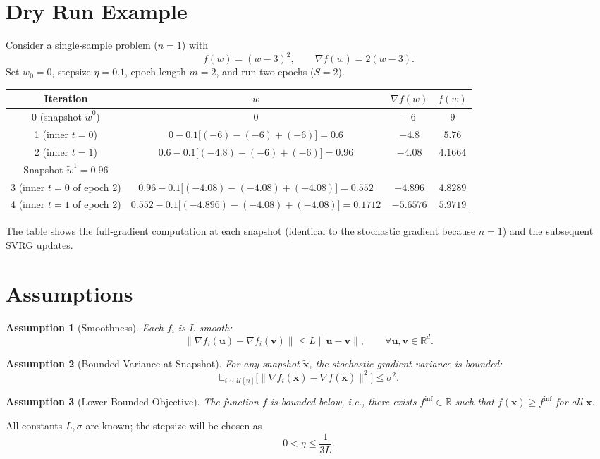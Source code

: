 \documentclass{article}
\newtheorem{assumption}{Assumption}
\newcommand{\EE}{\mathbb{E}}
\newcommand{\RR}{\mathbb{R}}
\begin{document}
\section*{Dry Run Example}
Consider a single‑sample problem ($n=1$) with
\[
f(w)= (w-3)^2,\qquad \nabla f(w)=2(w-3).
\]
Set $w_0=0$, stepsize $\eta=0.1$, epoch length $m=2$, and run two epochs ($S=2$).

\begin{center}
\begin{tabular}{c|c|c|c}
Iteration & $w$ & $\nabla f(w)$ & $f(w)$\\ \hline
0 (snapshot $\tilde w^0$) & $0$ & $-6$ & $9$\\
1 (inner $t=0$) & $0-0.1\bigl[(-6)-(-6)+(-6)\bigr]=0.6$ & $-4.8$ & $5.76$\\
2 (inner $t=1$) & $0.6-0.1\bigl[(-4.8)-(-6)+(-6)\bigr]=0.96$ & $-4.08$ & $4.1664$\\ \hline
Snapshot $\tilde w^1=0.96$ &  &  &  \\ \hline
3 (inner $t=0$ of epoch 2) & $0.96-0.1\bigl[(-4.08)-(-4.08)+(-4.08)\bigr]=0.552$ & $-4.896$ & $4.8289$\\
4 (inner $t=1$ of epoch 2) & $0.552-0.1\bigl[(-4.896)-(-4.08)+(-4.08)\bigr]=0.1712$ & $-5.6576$ & $5.9719$
\end{tabular}
\end{center}
The table shows the full‑gradient computation at each snapshot (identical to the stochastic gradient because $n=1$) and the subsequent SVRG updates.

\section*{Assumptions}
\begin{assumption}[Smoothness]\label{ass:smooth}
Each $f_i$ is $L$‑smooth:
\[
\|\nabla f_i(\mathbf{u})-\nabla f_i(\mathbf{v})\|\le L\|\mathbf{u}-\mathbf{v}\|,\qquad\forall\mathbf{u},\mathbf{v}\in\RR^{d}.
\]
\end{assumption}
\begin{assumption}[Bounded Variance at Snapshot]\label{ass:var}
For any snapshot $\tilde{\mathbf{x}}$, the stochastic gradient variance is bounded:
\[
\EE_{i\sim\mathcal{U}[n]}\bigl[\|\nabla f_i(\tilde{\mathbf{x}})-\nabla f(\tilde{\mathbf{x}})\|^{2}\bigr]\le\sigma^{2}.
\]
\end{assumption}
\begin{assumption}[Lower Bounded Objective]\label{ass:lb}
The function $f$ is bounded below, i.e., there exists $f^{\inf}\in\RR$ such that $f(\mathbf{x})\ge f^{\inf}$ for all $\mathbf{x}$.
\end{assumption}
All constants $L,\sigma$ are known; the stepsize will be chosen as
\[
0<\eta\le\frac{1}{3L}.
\tag{3}
\]
\end{document}
